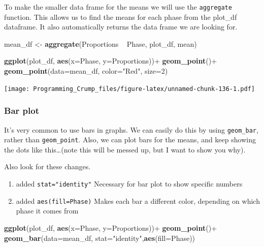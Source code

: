 \documentclass[]{book}
\newenvironment{Shaded}{\begin{snugshade}}{\end{snugshade}}
\newcommand{\KeywordTok}[1]{\textcolor[rgb]{0.13,0.29,0.53}{\textbf{{#1}}}}
\newcommand{\DataTypeTok}[1]{\textcolor[rgb]{0.13,0.29,0.53}{{#1}}}
\newcommand{\DecValTok}[1]{\textcolor[rgb]{0.00,0.00,0.81}{{#1}}}
\newcommand{\StringTok}[1]{\textcolor[rgb]{0.31,0.60,0.02}{{#1}}}
\newcommand{\NormalTok}[1]{{#1}}
\providecommand{\tightlist}{%
  \setlength{\itemsep}{0pt}\setlength{\parskip}{0pt}}
\theoremstyle{definition}
\theoremstyle{definition}
\theoremstyle{definition}
\theoremstyle{remark}
\begin{document}
To make the smaller data frame for the means we will use the
\texttt{aggregate} function. This allows us to find the means for each
phase from the plot\_df dataframe. It also automatically returns the
data frame we are looking for.

\begin{Shaded}
\begin{Highlighting}[]
\NormalTok{mean_df <-}\StringTok{ }\KeywordTok{aggregate}\NormalTok{(Proportions ~}\StringTok{ }\NormalTok{Phase, plot_df, mean)}

\KeywordTok{ggplot}\NormalTok{(plot_df, }\KeywordTok{aes}\NormalTok{(}\DataTypeTok{x=}\NormalTok{Phase, }\DataTypeTok{y=}\NormalTok{Proportions))+}\StringTok{ }
\StringTok{  }\KeywordTok{geom_point}\NormalTok{()+}
\StringTok{  }\KeywordTok{geom_point}\NormalTok{(}\DataTypeTok{data=}\NormalTok{mean_df, }\DataTypeTok{color=}\StringTok{"Red"}\NormalTok{, }\DataTypeTok{size=}\DecValTok{2}\NormalTok{)}
\end{Highlighting}
\end{Shaded}

\texttt{[image: Programming\_Crump\_files/figure-latex/unnamed-chunk-136-1.pdf]}

\subsubsection{Bar plot}\label{bar-plot}

It's very common to use bars in graphs. We can easily do this by using
\texttt{geom\_bar}, rather than \texttt{geom\_point}. Also, we can plot
bars for the means, and keep showing the dots like this\ldots{}(note
this will be messed up, but I want to show you why).

Also look for these changes.

\begin{enumerate}
\def\labelenumi{\arabic{enumi}.}
\tightlist
\item
  added \texttt{stat="identity"} Necessary for bar plot to show specific
  numbers
\item
  added \texttt{aes(fill=Phase)} Makes each bar a different color,
  depending on which phase it comes from
\end{enumerate}

\begin{Shaded}
\begin{Highlighting}[]
\KeywordTok{ggplot}\NormalTok{(plot_df, }\KeywordTok{aes}\NormalTok{(}\DataTypeTok{x=}\NormalTok{Phase, }\DataTypeTok{y=}\NormalTok{Proportions))+}\StringTok{ }
\StringTok{  }\KeywordTok{geom_point}\NormalTok{()+}
\StringTok{  }\KeywordTok{geom_bar}\NormalTok{(}\DataTypeTok{data=}\NormalTok{mean_df, }\DataTypeTok{stat=}\StringTok{"identity"}\NormalTok{,}\KeywordTok{aes}\NormalTok{(}\DataTypeTok{fill=}\NormalTok{Phase))}
\end{Highlighting}
\end{Shaded}
\end{document}
